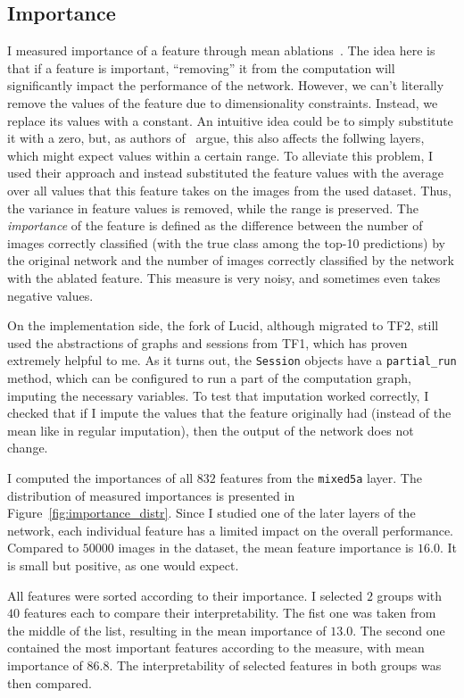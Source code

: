 \documentclass[12pt]{article}
\begin{document}
\subsection{Importance}
I measured importance of a feature through mean ablations~\cite{wang2022interpretability}. The idea here is that if a feature is important, ``removing'' it from the computation will significantly impact the performance of the network. However, we can't literally remove the values of the feature due to dimensionality constraints. Instead, we replace its values with a constant. An intuitive idea could be to simply substitute it with a zero, but, as authors of~\cite{wang2022interpretability} argue, this also affects the follwing layers, which might expect values within a certain range. To alleviate this problem, I used their approach and instead substituted the feature values with the average over all values that this feature takes on the images from the used dataset. Thus, the variance in feature values is removed, while the range is preserved. The \textit{importance} of the feature is defined as the difference between the number of images correctly classified (with the true class among the top-10 predictions) by the original network and the number of images correctly classified by the network with the ablated feature. This measure is very noisy, and sometimes even takes negative values.

On the implementation side, the fork of Lucid, although migrated to TF2, still used the abstractions of graphs and sessions from TF1, which has proven extremely helpful to me. As it turns out, the \texttt{Session} objects have a \texttt{partial\_run} method, which can be configured to run a part of the computation graph, imputing the necessary variables. To test that imputation worked correctly, I checked that if I impute the values that the feature originally had (instead of the mean like in regular imputation), then the output of the network does not change.

I computed the importances of all $832$ features from the \texttt{mixed5a} layer. The distribution of measured importances is presented in Figure~\ref{fig:importance_distr}. Since I studied one of the later layers of the network, each individual feature has a limited impact on the overall performance. Compared to $50000$ images in the dataset, the mean feature importance is $16.0$. It is small but positive, as one would expect.

All features were sorted according to their importance. I selected $2$ groups with $40$ features each to compare their interpretability. The fist one was taken from the middle of the list, resulting in the mean importance of $13.0$. The second one contained the most important features according to the measure, with mean importance of $86.8$. The interpretability of selected features in both groups was then compared.
\end{document}
